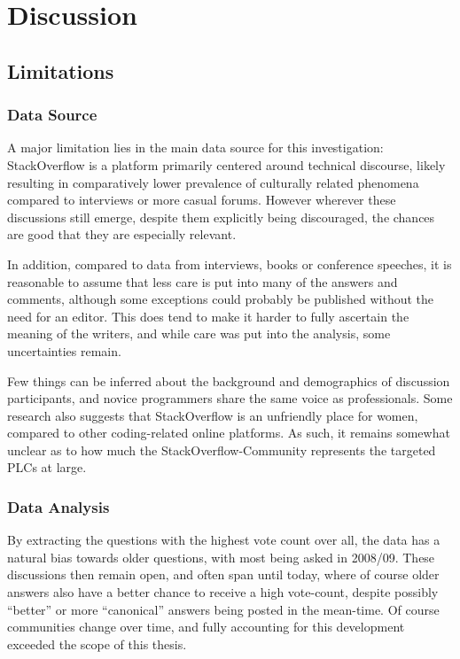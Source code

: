 \section{Discussion}

\subsection{Limitations}

\subsubsection{Data Source}
\label{sec:6.1.1}

A major limitation lies in the main data source for this investigation: StackOverflow is a platform primarily centered
around technical discourse, likely resulting in comparatively lower prevalence of culturally related phenomena compared
to interviews or more casual forums. However wherever these discussions still emerge, despite them explicitly being
discouraged, the chances are good that they are especially relevant.

In addition, compared to data from interviews, books or conference speeches, it is reasonable to assume that less care
is put into many of the answers and comments, although some exceptions could probably be published without the need for
an editor. This does tend to make it harder to fully ascertain the meaning of the writers, and while care was put into
the analysis, some uncertainties remain.

Few things can be inferred about the background and demographics of discussion participants, and novice programmers
share the same voice as professionals. Some research also suggests that StackOverflow is an unfriendly place for women,
compared to other coding-related online platforms. As such, it remains somewhat unclear as to how much the
StackOverflow-Community represents the targeted PLCs at large.

\subsubsection{Data Analysis}

By extracting the questions with the highest vote count over all, the data has a natural bias towards older questions,
with most being asked in 2008/09. These discussions then remain open, and often span until today, where of course older
answers also have a better chance to receive a high vote-count, despite possibly “better” or more “canonical” answers
being posted in the mean-time. Of course communities change over time, and fully accounting for this development
exceeded the scope of this thesis.

